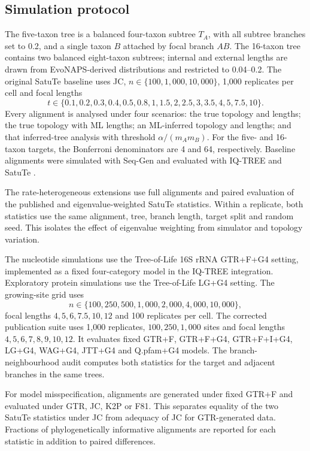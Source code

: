 \subsection*{Simulation protocol}

The five-taxon tree is a balanced four-taxon subtree \(T_A\), with all subtree branches set to 0.2, and a single taxon \(B\) attached by focal branch \(AB\). The 16-taxon tree contains two balanced eight-taxon subtrees; internal and external lengths are drawn from EvoNAPS-derived distributions and restricted to 0.04--0.2. The original SatuTe baseline uses JC, \(n\in\{100,1{,}000,10{,}000\}\), 1,000 replicates per cell and focal lengths
\[
t\in\{0.1,0.2,0.3,0.4,0.5,0.8,1,1.5,2,2.5,3,3.5,4,5,7.5,10\}.
\]
Every alignment is analysed under four scenarios: the true topology and lengths; the true topology with ML lengths; an ML-inferred topology and lengths; and that inferred-tree analysis with threshold \(\alpha/(m_A m_B)\). For the five- and 16-taxon targets, the Bonferroni denominators are 4 and 64, respectively. Baseline alignments were simulated with Seq-Gen and evaluated with IQ-TREE and SatuTe \cite{rambaut1997,minh2020iqtree}.

The rate-heterogeneous extensions use full alignments and paired evaluation of the published and eigenvalue-weighted SatuTe statistics. Within a replicate, both statistics use the same alignment, tree, branch length, target split and random seed. This isolates the effect of eigenvalue weighting from simulator and topology variation.

The nucleotide simulations use the Tree-of-Life 16S rRNA GTR+F+G4 setting, implemented as a fixed four-category model in the IQ-TREE integration. Exploratory protein simulations use the Tree-of-Life LG+G4 setting. The growing-site grid uses
\[
n\in\{100,250,500,1{,}000,2{,}000,4{,}000,10{,}000\},
\]
focal lengths \(4,5,6,7.5,10,12\) and 100 replicates per cell. The corrected publication suite uses 1,000 replicates, \(100,250,1{,}000\) sites and focal lengths \(4,5,6,7,8,9,10,12\). It evaluates fixed GTR+F, GTR+F+G4, GTR+F+I+G4, LG+G4, WAG+G4, JTT+G4 and Q.pfam+G4 models. The branch-neighbourhood audit computes both statistics for the target and adjacent branches in the same trees.

For model misspecification, alignments are generated under fixed GTR+F and evaluated under GTR, JC, K2P or F81. This separates equality of the two SatuTe statistics under JC from adequacy of JC for GTR-generated data. Fractions of phylogenetically informative alignments are reported for each statistic in addition to paired differences.


